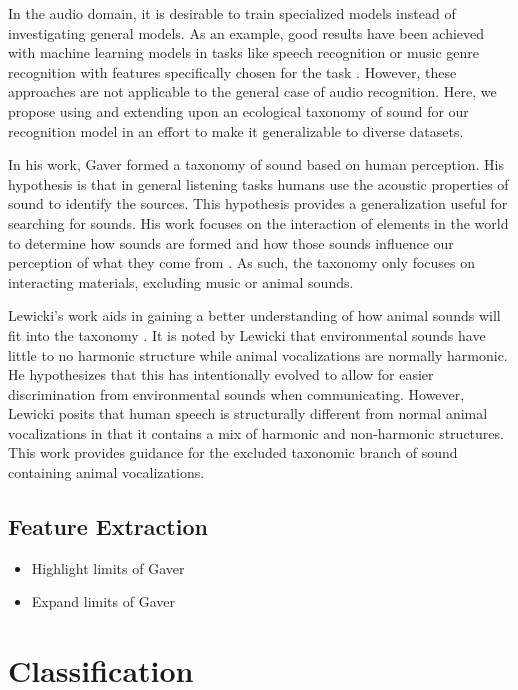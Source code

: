 In the audio domain, it is desirable to train specialized models instead of investigating general models. As an example, good results have been achieved with machine learning models in tasks like speech recognition or music genre recognition with features specifically chosen for the task \cite{Campbell1997, tzanetakis_musical_2002}. However, these approaches are not applicable to the general case of audio recognition. Here, we propose using and extending upon an ecological taxonomy of sound for our recognition model in an effort to make it generalizable to diverse datasets.

In his work, Gaver formed a taxonomy of sound based on human perception. His hypothesis is that in general listening tasks humans use the acoustic properties of sound to identify the sources. This hypothesis provides a generalization useful for searching for sounds. His work focuses on the interaction of elements in the world to determine how sounds are formed and how those sounds influence our perception of what they come from \cite{Gaver1993}. As such, the taxonomy only focuses on interacting materials, excluding music or animal sounds.

Lewicki's work aids in gaining a better understanding of how animal sounds will fit into the taxonomy \cite{lewicki_efficient_2002}. It is noted by Lewicki that environmental sounds have little to no harmonic structure while animal vocalizations are normally harmonic. He hypothesizes that this has intentionally evolved to allow for easier discrimination from environmental sounds when communicating. However, Lewicki posits that human speech is structurally different from normal animal vocalizations in that it contains a mix of harmonic and non-harmonic structures. This work provides guidance for the excluded taxonomic branch of sound containing animal vocalizations.

\subsection{Feature Extraction}
\begin{itemize}
    \item Highlight limits of Gaver
    \item Expand limits of Gaver
\end{itemize}

\section{Classification}
